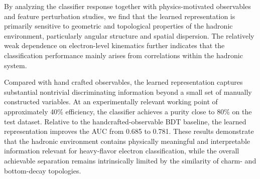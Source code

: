\documentclass[preprint,12pt]{elsarticle}
\begin{document}
By analyzing the classifier response together with physics-motivated observables and feature perturbation studies, we find that the learned representation is primarily sensitive to geometric and topological properties of the hadronic environment, particularly angular structure and spatial dispersion. The relatively weak dependence on electron-level kinematics further indicates that the classification performance mainly arises from correlations within the hadronic system.

Compared with hand crafted observables, the learned representation captures substantial nontrivial discriminating information beyond a small set of manually constructed variables. At an experimentally relevant working point of approximately 40\% efficiency, the classifier achieves a purity close to 80\% on the test dataset. Relative to the handcrafted-observable BDT baseline, the learned representation improves the AUC from 0.685 to 0.781. These results demonstrate that the hadronic environment contains physically meaningful and interpretable information relevant for heavy-flavor electron classification, while the overall achievable separation remains intrinsically limited by the similarity of charm- and bottom-decay topologies.




\end{document}
